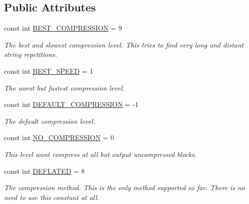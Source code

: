 \subsection*{Public Attributes}
\begin{DoxyCompactItemize}
\item 
const int \hyperlink{class_i_c_sharp_code_1_1_sharp_zip_lib_1_1_zip_1_1_compression_1_1_deflater_a48bb9f670d4d5783fe8d961c94abc6c5}{B\+E\+S\+T\+\_\+\+C\+O\+M\+P\+R\+E\+S\+S\+I\+ON} = 9
\begin{DoxyCompactList}\small\item\em The best and slowest compression level. This tries to find very long and distant string repetitions. \end{DoxyCompactList}\item 
const int \hyperlink{class_i_c_sharp_code_1_1_sharp_zip_lib_1_1_zip_1_1_compression_1_1_deflater_a2cdcb79df38a40a31551bf83e136c341}{B\+E\+S\+T\+\_\+\+S\+P\+E\+ED} = 1
\begin{DoxyCompactList}\small\item\em The worst but fastest compression level. \end{DoxyCompactList}\item 
const int \hyperlink{class_i_c_sharp_code_1_1_sharp_zip_lib_1_1_zip_1_1_compression_1_1_deflater_a46b1664d22d2ba8d08620b3ff848063b}{D\+E\+F\+A\+U\+L\+T\+\_\+\+C\+O\+M\+P\+R\+E\+S\+S\+I\+ON} = -\/1
\begin{DoxyCompactList}\small\item\em The default compression level. \end{DoxyCompactList}\item 
const int \hyperlink{class_i_c_sharp_code_1_1_sharp_zip_lib_1_1_zip_1_1_compression_1_1_deflater_a7bbbdacd59167e196eef92c3753b37ff}{N\+O\+\_\+\+C\+O\+M\+P\+R\+E\+S\+S\+I\+ON} = 0
\begin{DoxyCompactList}\small\item\em This level won\textquotesingle{}t compress at all but output uncompressed blocks. \end{DoxyCompactList}\item 
const int \hyperlink{class_i_c_sharp_code_1_1_sharp_zip_lib_1_1_zip_1_1_compression_1_1_deflater_a3d3465bd16292776ddcf2f5a6fa4c134}{D\+E\+F\+L\+A\+T\+ED} = 8
\begin{DoxyCompactList}\small\item\em The compression method. This is the only method supported so far. There is no need to use this constant at all. \end{DoxyCompactList}\end{DoxyCompactItemize}
